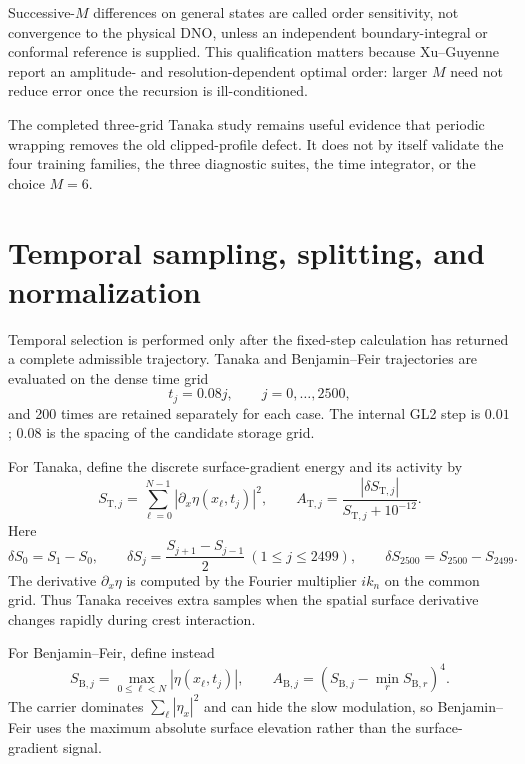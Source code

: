 \documentclass[11pt]{article}
\begin{document}
Successive-$M$ differences on general states are called order sensitivity,
not convergence to the physical DNO, unless an independent boundary-integral
or conformal reference is supplied.  This qualification matters because
Xu--Guyenne report an amplitude- and resolution-dependent optimal order:
larger $M$ need not reduce error once the recursion is ill-conditioned.

The completed three-grid Tanaka study remains useful evidence that periodic
wrapping removes the old clipped-profile defect.  It does not by itself
validate the four training families, the three diagnostic suites, the time
integrator, or the choice $M=6$.

\section{Temporal sampling, splitting, and normalization}
\label{sec:splitting}

Temporal selection is performed only after the fixed-step calculation has
returned a complete admissible trajectory.  Tanaka and Benjamin--Feir trajectories are
evaluated on the dense time grid
\begin{equation}
  t_j=0.08j,\qquad j=0,\ldots,2500,
  \label{eq:adaptive-dense-times}
\end{equation}
and 200 times are retained separately for each case.  The internal GL2 step
is $0.01$; $0.08$ is the spacing of the candidate storage grid.

For Tanaka, define the discrete surface-gradient energy and its activity by
\begin{equation}
  S_{\mathrm T,j}=\sum_{\ell=0}^{N-1}
    |\partial_x\eta(x_\ell,t_j)|^2,
  \qquad
  A_{\mathrm T,j}
  =\frac{|\delta S_{\mathrm T,j}|}{S_{\mathrm T,j}+10^{-12}}.
  \label{eq:tanaka-time-activity}
\end{equation}
Here
\[
  \delta S_0=S_1-S_0,\qquad
  \delta S_j=\frac{S_{j+1}-S_{j-1}}2\ (1\leq j\leq2499),\qquad
  \delta S_{2500}=S_{2500}-S_{2499}.
\]
The derivative $\partial_x\eta$ is computed by the Fourier multiplier
$ik_n$ on the common grid.  Thus Tanaka receives extra samples
when the spatial surface derivative changes rapidly during crest interaction.

For Benjamin--Feir, define instead
\begin{equation}
  S_{\mathrm B,j}=\max_{0\leq\ell<N}|\eta(x_\ell,t_j)|,
  \qquad
  A_{\mathrm B,j}
  =\left(S_{\mathrm B,j}-\min_r S_{\mathrm B,r}\right)^4.
  \label{eq:bf-time-activity}
\end{equation}
The carrier dominates $\sum_\ell|\eta_x|^2$ and can hide the slow modulation,
so Benjamin--Feir uses the maximum absolute surface elevation rather than the
surface-gradient signal.
\end{document}
